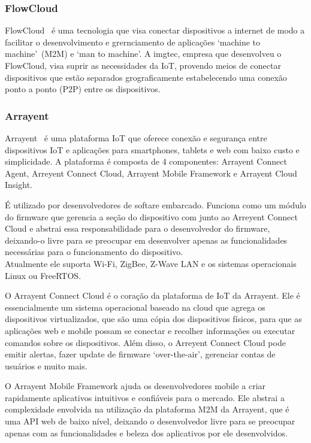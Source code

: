 \subsubsection{FlowCloud}
FlowCloud~\cite{flowcloud} é uma tecnologia que visa conectar dispositivos a internet de modo a facilitar o
desenvolvimento e grernciamento de aplicações \lq machine to machine\rq\ (M2M) e \lq man to machine\rq. A imgtec,
empresa que desenvolveu o FlowCloud, visa suprir as necessidades da IoT, provendo meios de conectar dispositivos
que estão separados grograficamente estabelecendo uma conexão ponto a ponto (P2P) entre os dispositivos.

\subsubsection{Arrayent}
Arrayent~\cite{arrayent} é uma plataforma IoT que oferece conexão e segurança entre dispositivos IoT e aplicações
para  smartphones, tablets e web com baixo custo e simplicidade. A plataforma é composta de 4 componentes:
Arrayent Connect Agent, Arreyent Connect Cloud, Arrayent Mobile Framework e Arrayent Cloud Insight.

É utilizado por desenvolvedores de softare embarcado. Funciona como um módulo do firmware que gerencia a
seção do dispositivo com junto ao Arreyent Connect Cloud e abstrai essa responsabilidade para o desenvolvedor
do firmware, deixando-o livre para se preocupar em desenvolver apenas as funcionalidades necessárias para o
funcionamento do dispositivo.\\
Atualmente ele suporta Wi-Fi, ZigBee, Z-Wave LAN e os sistemas operacionais Linux ou FreeRTOS.

O Arrayent Connect Cloud é o coração da plataforma de IoT da Arrayent. Ele é essencialmente um sistema
operacional baseado na cloud que agrega os dispositivos virtualizados, que são uma cópia dos dispositivos
físicos, para que as aplicações web e mobile possam se conectar e recolher informações ou executar comandos
sobre os dispositivos. Além disso, o Arreyent Connect Cloud pode emitir alertas, fazer update de firmware
\lq over-the-air\rq, gerenciar contas de usuários e muito mais.

O Arrayent Mobile Framework ajuda os desenvolvedores mobile a criar rapidamente aplicativos intuitivos e
confiáveis para o mercado. Ele abstrai a complexidade envolvida na utilização da plataforma M2M da Arrayent,
que é uma API web de baixo nível, deixando o desenvolvedor livre para se preocupar apenas com as funcionalidades
e beleza dos aplicativos por ele desenvolvidos.

